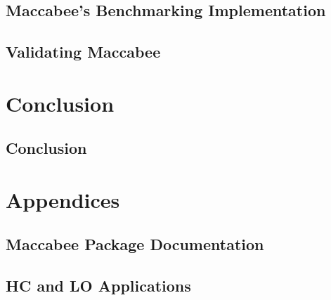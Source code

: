\documentclass[oneside, fleqn]{book}
\begin{document}
\chapter{Maccabee's Benchmarking Implementation}
\label{chap:macimplementation}

\chapter{Validating Maccabee}
\label{chap:macvalidation}


\part{Conclusion}
\chapter{Conclusion}
\label{chap:conclusion}


\part{Appendices}
\appendix

\chapter{Maccabee Package Documentation}
\label{app:package-docs}


\chapter{HC and LO Applications}
\label{app:hclo}


\backmatter

 
\end{document}
